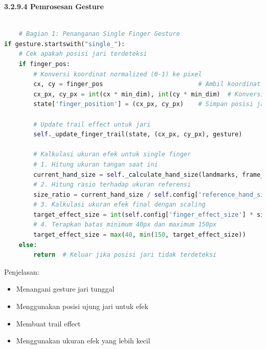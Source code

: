 \documentclass[11pt,a4paper]{article}
\begin{document}
    \noindent\textbf{3.2.9.4 Pemrosesan Gesture}
    \begin{lstlisting}[language=Python, caption= Single Finger Gesture]
        
    # Bagian 1: Penanganan Single Finger Gesture
if gesture.startswith("single_"):
    # Cek apakah posisi jari terdeteksi
    if finger_pos:
        # Konversi koordinat normalized (0-1) ke pixel
        cx, cy = finger_pos                          # Ambil koordinat normalized
        cx_px, cy_px = int(cx * min_dim), int(cy * min_dim)  # Konversi ke pixel
        state['finger_position'] = (cx_px, cy_px)    # Simpan posisi jari
        
        # Update trail effect untuk jari
        self._update_finger_trail(state, (cx_px, cy_px), gesture)
        
        # Kalkulasi ukuran efek untuk single finger
        # 1. Hitung ukuran tangan saat ini
        current_hand_size = self._calculate_hand_size(landmarks, frame_dims)
        # 2. Hitung rasio terhadap ukuran referensi
        size_ratio = current_hand_size / self.config['reference_hand_size']
        # 3. Kalkulasi ukuran efek final dengan scaling
        target_effect_size = int(self.config['finger_effect_size'] * size_ratio * self.config['finger_size_scale'])
        # 4. Terapkan batas minimum 40px dan maximum 150px
        target_effect_size = max(40, min(150, target_effect_size))
    else:
        return  # Keluar jika posisi jari tidak terdeteksi
    \end{lstlisting}
    Penjelasan: 
    \begin{itemize}
        \item Menangani gesture jari tunggal
        \item Menggunakan posisi ujung jari untuk efek
        \item Membuat trail effect
        \item Menggunakan ukuran efek yang lebih kecil
    \end{itemize}
\end{document}
